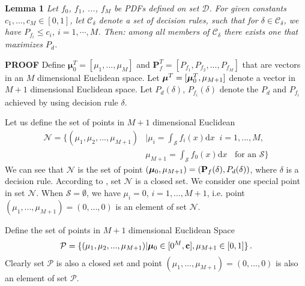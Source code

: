 \noindent \textbf{Lemma 1}
\noindent \textit{Let $f_0$, $f_1$, ..., $f_M$ be PDFs defined on set $\mathcal{D}$. For given constants $c_1, ..., c_M \in [0, 1]$, let $\mathcal{C}_\delta$ denote a set of decision rules,  such that for $\delta \in \mathcal{C}_\delta$, we have $P_{f_i} \leq c_i$, $i = 1, \cdots, M$. Then:
 among all members of $\mathcal{C}_\delta$ there exists one that maximizes $P_d$.}

\noindent \textbf{PROOF}
Define $\boldsymbol{\mu}_0^T = [\mu_1, ..., \mu_M]$  and  $\mathbf{P}_f^T = [P_{f_1}, P_{f_2}, ..., P_{f_M}]$ that are vectors in an $M$ dimensional Euclidean  space. Let $\boldsymbol{\mu}^T = [\boldsymbol{\mu}_0^T, \mu_{M+1}]$ denote a vector in $M+1$ dimensional Euclidean space. 
Let $P_d(\delta)$, $P_{f_i}(\delta)$ denote the $P_d$ and $P_{f_i}$ achieved by using decision rule $\delta$.

Let us define the set of points in $M+1$ dimensional Euclidean
\begin{equation}
\begin{split}
\label{2015apr28a0}
  \mathcal{N} = \{(\mu_1, \mu_2, ..., \mu_{M+1}) &| \mu_i = \int_{\mathcal{S}}f_i(x)\mathrm{d}x \;\;i=1, ..., M,\\
                                            &  \mu_{M+1}=\int_{\mathcal{S}}f_{0}(x)\mathrm{d}x \;\;\text{ for an $\mathcal{S}$}\}
\end{split}
\end{equation}
We can see that $\mathcal{N}$ is the set of point $(\boldsymbol{\mu}_0, \mu_{M+1})=(\mathbf{P}_f(\delta), P_d(\delta))$, where $\delta$ is a decision rule. According to \cite{LehmannTest}, set $\mathcal{N}$ is a closed set. We consider one special point in set $\mathcal{N}$. When $\mathcal{S} = \emptyset$, we have $\mu_i = 0$, $i = 1, ..., M+1$, i.e. point $(\mu_1, ..., \mu_{M+1}) = (0, ..., 0)$ is an element of set $\mathcal{N}$.

Define the set of points in $M+1$ dimensional Euclidean Space 
\begin{equation}
\mathcal{P} = \{
(\mu_1, \mu_2, ..., \mu_{M+1}) | \boldsymbol{\mu}_0 \in [0^M, \mathbf{c}], \mu_{M+1} \in [0, 1]
\}\,.
\end{equation}
Clearly set $\mathcal{P}$ is also a closed set and point $(\mu_1, ..., \mu_{M+1}) = (0, ..., 0)$ is also an element  of set $\mathcal{P}$.



